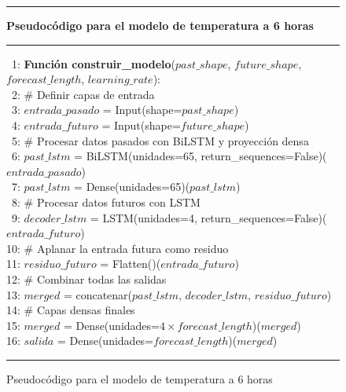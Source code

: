 \begin{figure}[H]
{\small
\hrule
{\bf\small Pseudocódigo para el modelo de temperatura a 6 horas}
\hrule
\begin{center}
\begin{tabbing}
\ 1: {\bf Fun}\={\bf ción construir\_modelo}($past\_shape$, $future\_shape$, $forecast\_length$, $learning\_rate$): \\
\ 2: \> \# Definir capas de entrada \\
\ 3: \> $entrada\_pasado$ = Input(shape=$past\_shape$) \\
\ 4: \> $entrada\_futuro$ = Input(shape=$future\_shape$) \\
\ 5: \> \# Procesar datos pasados con BiLSTM y proyección densa \\
\ 6: \> $past\_lstm$ = BiLSTM(unidades=65, return\_sequences=False)($entrada\_pasado$) \\
\ 7: \> $past\_lstm$ = Dense(unidades=65)($past\_lstm$) \\
\ 8: \> \# Procesar datos futuros con LSTM \\
\ 9: \> $decoder\_lstm$ = LSTM(unidades=4, return\_sequences=False)($entrada\_futuro$) \\
10: \> \# Aplanar la entrada futura como residuo \\
11: \> $residuo\_futuro$ = Flatten()($entrada\_futuro$) \\
12: \> \# Combinar todas las salidas \\
13: \> $merged$ = concatenar($past\_lstm$, $decoder\_lstm$, $residuo\_futuro$) \\
14: \> \# Capas densas finales \\
15: \> $merged$ = Dense(unidades=$4 \times forecast\_length$)($merged$) \\
16: \> $salida$ = Dense(unidades=$forecast\_length$)($merged$) \\
\end{tabbing}
\end{center}
}
\hrule
\caption{Pseudocódigo para el modelo de temperatura a 6 horas}
\label{lstm_model_temp_6h}
\end{figure}

